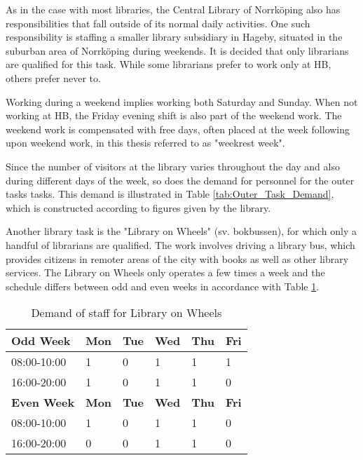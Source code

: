 As in the case with most libraries, the Central Library of Norrköping also has responsibilities that fall outside of its normal daily activities. One such responsibility is staffing a smaller library subsidiary in Hageby, situated in the suburban area of Norrköping during weekends. It is decided that only librarians are qualified for this task. While some librarians prefer to work only at HB, others prefer never to.

Working during a weekend implies working both Saturday and Sunday. When not working at HB, the Friday evening shift is also part of the weekend work. The weekend work is compensated with free days, often placed at the week following upon weekend work, in this thesis referred to as "weekrest week".


Since the number of visitors at the library varies throughout the day and also during different days of the week, so does the demand for personnel for the outer tasks tasks. This demand is illustrated in Table \ref{tab:Outer_Task_Demand}, which is constructed according to figures given by the library. 

Another library task is the "Library on Wheels" (sv. bokbussen), for which only a handful of librarians are qualified. The work involves driving a library bus, which provides citizens in remoter areas of the city with books as well as other library services. The Library on Wheels only operates a few times a week and the schedule differs between odd and even weeks in accordance with Table \ref{tab:LOW_Demand}.

\begin{table}[ht]
\centering
\caption{Demand of staff for Library on Wheels}
\label{tab:LOW_Demand}
\begin{tabularx}{0.80\textwidth}{|l|X|X|X|X|X|}
\hline
 \textbf{Odd Week} & \textbf{Mon} & \textbf{Tue} & \textbf{Wed} & \textbf{Thu} & \textbf{Fri} 
 \\ \hline 
\rowcolor{Gray} 
08:00-10:00 & 1 & 0 & 1 & 1 & 1 
\\ \hline 
\rowcolor{Gray} 
16:00-20:00 & 1 & 0 & 1 & 1 & 0 
\\ \hline 
 \textbf{Even Week} & \textbf{Mon} & \textbf{Tue} & \textbf{Wed} & \textbf{Thu} & \textbf{Fri} 
 \\ \hline 
\rowcolor{Gray} 
08:00-10:00 & 1 & 0 & 1 & 1 & 0 
\\ \hline 
\rowcolor{Gray} 
16:00-20:00 & 0 & 0 & 1 & 1 & 0 
\\ \hline 
\end{tabularx}
\end{table}

